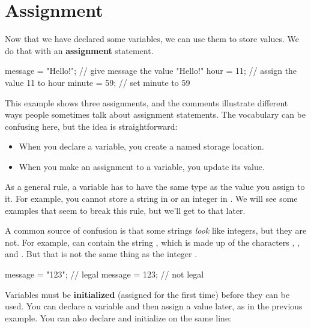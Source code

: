 \section{Assignment}


Now that we have declared some variables, we can use them to store values.
We do that with an {\bf assignment} statement.

\begin{code}
message = "Hello!";  // give message the value "Hello!"
hour = 11;           // assign the value 11 to hour
minute = 59;         // set minute to 59
\end{code}

This example shows three assignments, and the comments illustrate different ways people sometimes talk about assignment statements.
The vocabulary can be confusing here, but the idea is straightforward:

\begin{itemize}
\item When you declare a variable, you create a named storage location.
\item When you make an assignment to a variable, you update its value.
\end{itemize}

As a general rule, a variable has to have the same type as the value you assign to it.
For example, you cannot store a string in  or an integer in .
We will see some examples that seem to break this rule, but we'll get to that later.


A common source of confusion is that some strings {\em look} like integers, but they are not.
For example,  can contain the string , which is made up of the characters , , and .
But that is not the same thing as the integer .

\begin{code}
message = "123";     // legal
message = 123;       // not legal
\end{code}


Variables must be {\bf initialized} (assigned for the first time) before they can be used.
You can declare a variable and then assign a value later, as in the previous example.
You can also declare and initialize on the same line:

